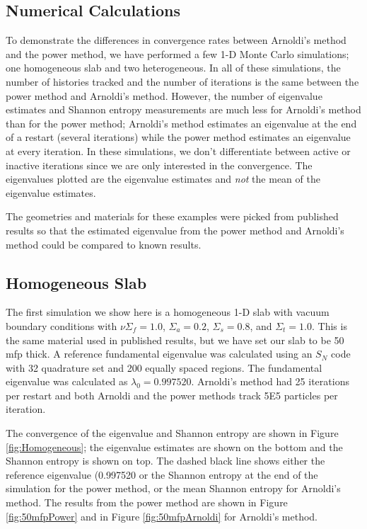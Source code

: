 \documentclass[12]{ansnse}
\begin{document}
\begin{doublespace}
\section{Numerical Calculations}\label{sec:Numerical}
To demonstrate the differences in convergence rates between Arnoldi's method and the power method, we have performed a few 1-D Monte Carlo simulations; one homogeneous slab and two heterogeneous.  In all of these simulations, the number of histories tracked and the number of iterations is the same between the power method and Arnoldi's method.  However, the number of eigenvalue estimates and Shannon entropy measurements are much less for Arnoldi's method than for the power method; Arnoldi's method estimates an eigenvalue at the end of a restart (several iterations) while the power method estimates an eigenvalue at every iteration.  In these simulations, we don't differentiate between active or inactive iterations since we are only interested in the convergence.  The eigenvalues plotted are the eigenvalue estimates and \emph{not} the mean of the eigenvalue estimates.

The geometries and materials for these examples were picked from published results\cite{Rathkopf:1986The-F-0,Ueki:2005Stati-0} so that the estimated eigenvalue from the power method and Arnoldi's method could be compared to known results.

\subsection{Homogeneous Slab}
The first simulation we show here is a homogeneous 1-D slab with vacuum boundary conditions with \mbox{$\nu\Sigma_f = 1.0$}, \mbox{$\Sigma_a = 0.2$}, \mbox{$\Sigma_s = 0.8$}, and  \mbox{$\Sigma_t = 1.0$}.  This is the same material used in published results\cite{Rathkopf:1986The-F-0}, but we have set our slab to be 50 mfp thick.  A reference fundamental eigenvalue was calculated using an $S_N$ code with 32 quadrature set and 200 equally spaced regions.  The fundamental eigenvalue was calculated as $\lambda_0 = 0.997520$.  Arnoldi's method had 25 iterations per restart and both Arnoldi and the power methods track \num{5E5} particles per iteration.

The convergence of the eigenvalue and Shannon entropy are shown in Figure \ref{fig:Homogeneous}; the eigenvalue estimates are shown on the bottom and the Shannon entropy is shown on top.  The dashed black line shows either the reference eigenvalue (\num[group-digits=false]{0.997520} or the Shannon entropy at the end of the simulation for the power method, or the mean Shannon entropy for Arnoldi's method.  The results from the power method are shown in Figure \ref{fig:50mfpPower} and in Figure \ref{fig:50mfpArnoldi} for Arnoldi's method.  
\begin{figure}[h]\centering


\end{figure}
\end{doublespace}
\end{document}
